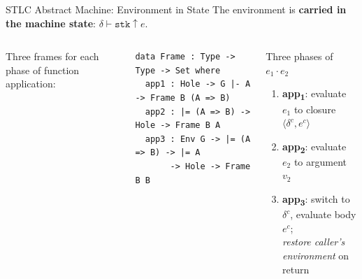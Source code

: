 \documentclass[10pt,compress,aspectratio=169]{beamer}
\begin{document}
\begin{frame}[fragile]{STLC Abstract Machine: Environment in State}
  The environment is \textbf{carried in the machine state}: $\delta \vdash \mathtt{stk} \uparrow e$.
  \medskip
  \begin{columns}[T]
      Three frames for each phase of function application:
      \begin{verbatim}
data Frame : Type -> Type -> Set where
  app1 : Hole -> G |- A   -> Frame B (A => B)
  app2 : |= (A => B) -> Hole -> Frame B A
  app3 : Env G -> |= (A => B) -> |= A
       -> Hole -> Frame B B
      \end{verbatim}
      \begin{block}{Three phases of $e_1 \cdot e_2$}
        \begin{enumerate}
          \item \textbf{app\textsubscript{1}}: evaluate $e_1$ to closure $\langle\delta^c, e^c\rangle$
          \item \textbf{app\textsubscript{2}}: evaluate $e_2$ to argument $v_2$
          \item \textbf{app\textsubscript{3}}: switch to $\delta^c$, evaluate body $e^c$;\\\emph{restore caller's environment} on return
        \end{enumerate}
      \end{block}
  \end{columns}
\end{frame}
\end{document}

